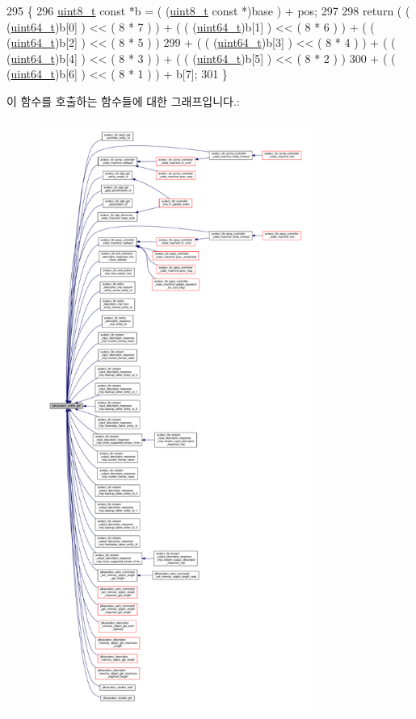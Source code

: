 \begin{DoxyCode}
295 \{
296     \hyperlink{stdint_8h_aba7bc1797add20fe3efdf37ced1182c5}{uint8\_t} \textcolor{keyword}{const} *b = ( (\hyperlink{stdint_8h_aba7bc1797add20fe3efdf37ced1182c5}{uint8\_t} \textcolor{keyword}{const} *)base ) + pos;
297 
298     \textcolor{keywordflow}{return} ( ( (\hyperlink{parse_8c_aec6fcb673ff035718c238c8c9d544c47}{uint64\_t})b[0] ) << ( 8 * 7 ) ) + ( ( (\hyperlink{parse_8c_aec6fcb673ff035718c238c8c9d544c47}{uint64\_t})b[1] ) << ( 8 * 6 ) ) + ( ( 
      (\hyperlink{parse_8c_aec6fcb673ff035718c238c8c9d544c47}{uint64\_t})b[2] ) << ( 8 * 5 ) )
299            + ( ( (\hyperlink{parse_8c_aec6fcb673ff035718c238c8c9d544c47}{uint64\_t})b[3] ) << ( 8 * 4 ) ) + ( ( (\hyperlink{parse_8c_aec6fcb673ff035718c238c8c9d544c47}{uint64\_t})b[4] ) << ( 8 * 3 ) ) + ( 
      ( (\hyperlink{parse_8c_aec6fcb673ff035718c238c8c9d544c47}{uint64\_t})b[5] ) << ( 8 * 2 ) )
300            + ( ( (\hyperlink{parse_8c_aec6fcb673ff035718c238c8c9d544c47}{uint64\_t})b[6] ) << ( 8 * 1 ) ) + b[7];
301 \}
\end{DoxyCode}


이 함수를 호출하는 함수들에 대한 그래프입니다.\+:
\nopagebreak
\begin{figure}[H]
\begin{center}
\leavevmode
\includegraphics[height=550pt]{group__endian_gac8c2b48b7d7db101708e0197e366ac42_icgraph}
\end{center}
\end{figure}


